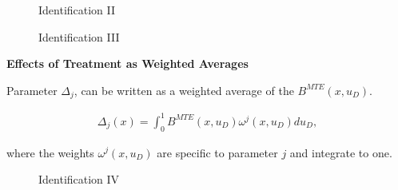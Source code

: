 \begin{frame}
\begin{figure}\caption{Identification II}
\end{figure}
\end{frame}
\begin{frame}
\begin{figure}\caption{Identification III}
\end{figure}
\end{frame}
\begin{frame}
\textbf{Effects of Treatment as Weighted Averages}\vspace{0.3cm}

Parameter \(\Delta_j\), can be written as a weighted average of the
\(B^{MTE}(x, u_D)\).

\begin{align*}
\Delta_j(x) = \int_0^1 B^{MTE}(x, u_D) \omega^j(x, u_D) du_D,
\end{align*}

where the weights \(\omega^j(x, u_D)\) are specific to parameter \(j\)
and integrate to one.
\end{frame}
\begin{frame}
\begin{figure}\caption{Identification IV}
\end{figure}
\end{frame}
